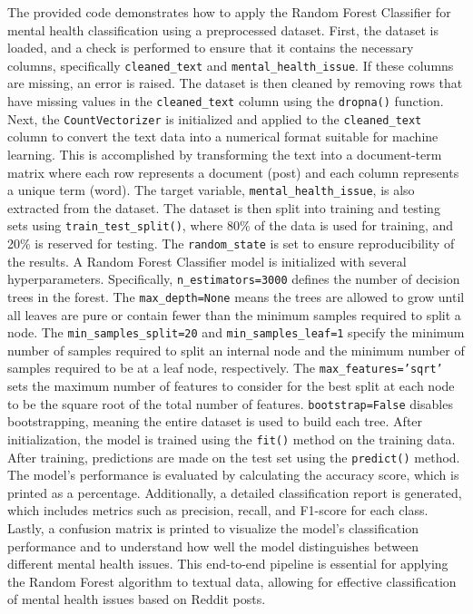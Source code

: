 \noindent
The provided code demonstrates how to apply the Random Forest Classifier for mental health classification using a preprocessed dataset. First, the dataset is loaded, and a check is performed to ensure that it contains the necessary columns, specifically \texttt{cleaned\_text} and \texttt{mental\_health\_issue}. If these columns are missing, an error is raised. The dataset is then cleaned by removing rows that have missing values in the \texttt{cleaned\_text} column using the \texttt{dropna()} function. Next, the \texttt{CountVectorizer} is initialized and applied to the \texttt{cleaned\_text} column to convert the text data into a numerical format suitable for machine learning. This is accomplished by transforming the text into a document-term matrix where each row represents a document (post) and each column represents a unique term (word). The target variable, \texttt{mental\_health\_issue}, is also extracted from the dataset. The dataset is then split into training and testing sets using \texttt{train\_test\_split()}, where 80\% of the data is used for training, and 20\% is reserved for testing. The \texttt{random\_state} is set to ensure reproducibility of the results. A Random Forest Classifier model is initialized with several hyperparameters. Specifically, \texttt{n\_estimators=3000} defines the number of decision trees in the forest. The \texttt{max\_depth=None} means the trees are allowed to grow until all leaves are pure or contain fewer than the minimum samples required to split a node. The \texttt{min\_samples\_split=20} and \texttt{min\_samples\_leaf=1} specify the minimum number of samples required to split an internal node and the minimum number of samples required to be at a leaf node, respectively. The \texttt{max\_features='sqrt'} sets the maximum number of features to consider for the best split at each node to be the square root of the total number of features. \texttt{bootstrap=False} disables bootstrapping, meaning the entire dataset is used to build each tree. After initialization, the model is trained using the \texttt{fit()} method on the training data. After training, predictions are made on the test set using the \texttt{predict()} method. The model's performance is evaluated by calculating the accuracy score, which is printed as a percentage. Additionally, a detailed classification report is generated, which includes metrics such as precision, recall, and F1-score for each class. Lastly, a confusion matrix is printed to visualize the model's classification performance and to understand how well the model distinguishes between different mental health issues. This end-to-end pipeline is essential for applying the Random Forest algorithm to textual data, allowing for effective classification of mental health issues based on Reddit posts.

